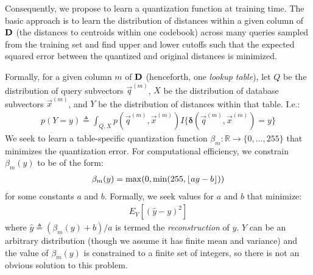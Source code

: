 Consequently, we propose to learn a quantization function at training time. The basic approach is to learn the distribution of distances within a given column of $\mat{D}$ (the distances to centroids within one codebook) across many queries sampled from the training set and find upper and lower cutoffs such that the expected squared error between the quantized and original distances is minimized.

Formally, for a given column $m$ of $\mat{D}$ (henceforth, one \textit{lookup table}), let $Q$ be the distribution of query subvectors $\vec{q}^{(m)}$, $X$ be the distribution of database subvectors $\vec{x}^{(m)}$, and $Y$ be the distribution of distances within that table. I.e.:
\begin{align}
    p(Y = y) \triangleq \int_{Q, X} p(\vec{q}^{(m)}, \vec{x}^{(m)})I\{\boldsymbol{\delta} \left( \vec{q}^{(m)}, \vec{x}^{(m)} \right) = y\}
\end{align}
We seek to learn a table-specific quantization function $\beta_m: \mathbb{R} \rightarrow \{0,\ldots,255\} $ that minimizes the quantization error. For computational efficiency, we constrain $\beta_m(y)$ to be of the form:
\begin{align}
    \beta_m(y) = \max(0, \min(255, \floor*{ay - b}))
\end{align}
for some constants $a$ and $b$. Formally, we seek values for $a$ and $b$ that minimize:
\begin{align}
    E_Y[(\hat{y} - y)^2]
\end{align}
where $\hat{y} \triangleq (\beta_m(y) + b)/a$ is termed the \textit{reconstruction} of $y$.
$Y$ can be an arbitrary distribution (though we assume it has finite mean and variance) and the value of $\beta_m(y)$ is constrained to a finite set of integers, so there is not an obvious solution to this problem.

